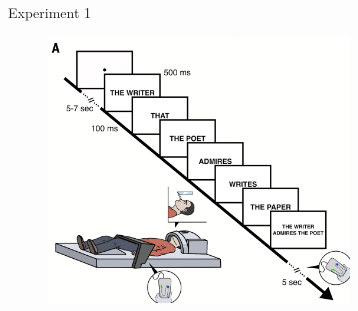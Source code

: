 \begin{frame}{Experiment 1}
\vspace{-0.2cm}
\begin{figure}
    \centering
    \includegraphics[width=8cm]{images/paper_pics/exp1.png}
    \label{fig:label1}
\end{figure}

\end{frame}